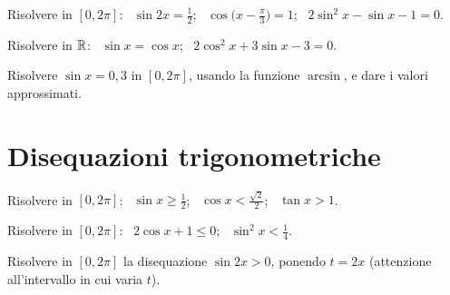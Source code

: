 \begin{esercizio}[\liv{2}]
Risolvere in $[0,2\pi]$: \ $\sin2x=\frac12$; \ $\cos\bigl(x-\frac\pi3\bigr)=1$; \ $2\sin^2x-\sin x-1=0$.
\end{esercizio}

\begin{esercizio}[\liv{2}]
Risolvere in $\mathbb R$: \ $\sin x=\cos x$; \ $2\cos^2x+3\sin x-3=0$.
\end{esercizio}

\begin{esercizio}[\liv{2}]
Risolvere $\sin x=0{,}3$ in $[0,2\pi]$, usando la funzione $\arcsin$, e dare i valori approssimati.
\end{esercizio}

\section{Disequazioni trigonometriche}

\begin{esercizio}[\liv{1}]
Risolvere in $[0,2\pi]$: \ $\sin x\ge\frac12$; \ $\cos x<\frac{\sqrt2}2$; \ $\tan x>1$.
\end{esercizio}
\risp{$[\frac\pi6,\frac{5\pi}6]$; \ $]\frac\pi4,\frac{7\pi}4[$; \ $]\frac\pi4,\frac\pi2[\,\cup\,]\frac{5\pi}4,\frac{3\pi}2[$.}

\begin{esercizio}[\liv{2}]
Risolvere in $[0,2\pi]$: \ $2\cos x+1\le0$; \ $\sin^2x<\frac14$.
\end{esercizio}

\begin{esercizio}[\liv{2}]
Risolvere in $[0,2\pi]$ la disequazione $\sin2x>0$, ponendo $t=2x$ (attenzione all'intervallo in cui varia $t$).
\end{esercizio}
\risp{$t\in[0,4\pi]$ e $\sin t>0$ per $t\in\,]0,\pi[\,\cup\,]2\pi,3\pi[$: $x\in\,]0,\frac\pi2[\,\cup\,]\pi,\frac{3\pi}2[$.}

